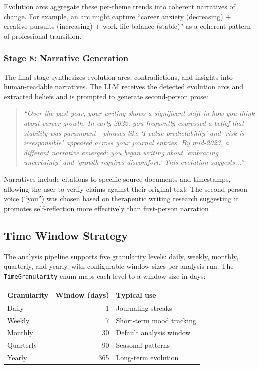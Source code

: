 \documentclass[manuscript,review]{acmart}
\begin{document}
Evolution arcs aggregate these per-theme trends into coherent narratives of change.
For example, an arc might capture ``career anxiety (decreasing) + creative pursuits (increasing) + work-life balance (stable)'' as a coherent pattern of professional transition.

\subsubsection{Stage 8: Narrative Generation}
The final stage synthesizes evolution arcs, contradictions, and insights into human-readable narratives.
The LLM receives the detected evolution arcs and extracted beliefs and is prompted to generate second-person prose:

\begin{quote}
\emph{``Over the past year, your writing shows a significant shift in how you think about career growth. In early 2022, you frequently expressed a belief that stability was paramount---phrases like `I value predictability' and `risk is irresponsible' appeared across your journal entries. By mid-2023, a different narrative emerged: you began writing about `embracing uncertainty' and `growth requires discomfort.' This evolution suggests...''}
\end{quote}

Narratives include citations to specific source documents and timestamps, allowing the user to verify claims against their original text.
The second-person voice (``you'') was chosen based on therapeutic writing research suggesting it promotes self-reflection more effectively than first-person narration~\cite{wilson2011selfhelp}.

\subsection{Time Window Strategy}
\label{sec:time-windows}

The analysis pipeline supports five granularity levels: daily, weekly, monthly, quarterly, and yearly, with configurable window sizes per analysis run.
The \texttt{TimeGranularity} enum maps each level to a window size in days:

\begin{center}
\begin{tabular}{lrl}
\toprule
Granularity & Window (days) & Typical use \\
\midrule
Daily       & 1   & Journaling streaks \\
Weekly      & 7   & Short-term mood tracking \\
Monthly     & 30  & Default analysis window \\
Quarterly   & 90  & Seasonal patterns \\
Yearly      & 365 & Long-term evolution \\
\bottomrule
\end{tabular}
\end{center}
\end{document}
